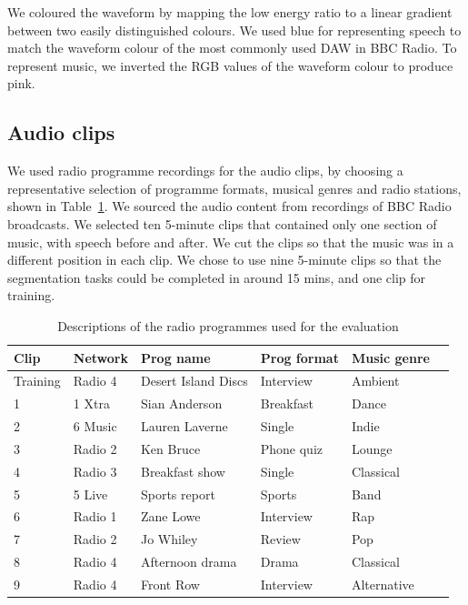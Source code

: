 We coloured the waveform by mapping the low energy ratio to a linear gradient between two easily distinguished colours.
We used blue for representing speech to match the waveform colour of the most commonly used DAW in BBC Radio. To
represent music, we inverted the RGB values of the waveform colour to produce pink.

\subsection{Audio clips}
We used radio programme recordings for the audio clips, by choosing a representative selection of programme formats,
musical genres and radio stations, shown in Table~\ref{tab:clips}.  We sourced the audio content from recordings of BBC
Radio broadcasts. We selected ten 5-minute clips that contained only one section of music, with speech before and
after. We cut the clips so that the music was in a different position in each clip.  We chose to use nine 5-minute
clips so that the segmentation tasks could be completed in around 15 mins, and one clip for training.

\begin{table}[htbp]
  \begin{center}
    {\small
    \begin{tabular}{l l l l l l}
      \hline
      \textbf{Clip} & \textbf{Network} & \textbf{Prog name} & \textbf{Prog format} & \textbf{Music genre} \\ \hline
      Training & Radio 4 & Desert Island Discs & Interview & Ambient \\
      1 & 1 Xtra & Sian Anderson & Breakfast & Dance \\
      2 & 6 Music & Lauren Laverne & Single & Indie \\
      3 & Radio 2 & Ken Bruce & Phone quiz & Lounge \\
      4 & Radio 3 & Breakfast show & Single & Classical \\
      5 & 5 Live & Sports report & Sports & Band \\
      6 & Radio 1 & Zane Lowe & Interview & Rap \\
      7 & Radio 2 & Jo Whiley & Review & Pop \\
      8 & Radio 4 & Afternoon drama & Drama & Classical \\
      9 & Radio 4 & Front Row & Interview & Alternative \\ \hline
    \end{tabular}
  }
  \end{center}
  \caption{Descriptions of the radio programmes used for the evaluation}
  \label{tab:clips}
\end{table}

